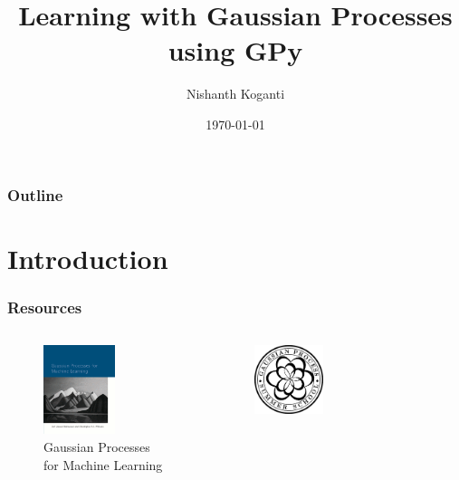 \documentclass[10pt]{beamer}
\title[GPs with GPy]{Learning with Gaussian Processes using GPy}
\author[Nishanth]{Nishanth Koganti}
\date{\today}
\begin{document}
  \begin{frame}[noframenumbering]
    \titlepage
  \end{frame}

  \begin{frame}[noframenumbering]
    \frametitle{Outline}
    \tableofcontents
  \end{frame}

  \section{Introduction}

  \begin{frame}
    \frametitle{Resources}

    \begin{columns}
      \begin{column}{0.5\textwidth}
        \begin{figure}
          \centering
          \includegraphics[width=0.6\textwidth]{gpml.png}
          \caption*{Gaussian Processes for Machine Learning \footnotemark[1]}
        \end{figure}
      \end{column}
      \begin{column}{0.5\textwidth}
        \begin{figure}
          \centering
          \includegraphics[width=0.4\textwidth]{gpss.png}

\end{figure}
\end{column}
\end{columns}
\end{frame}
\end{document}
